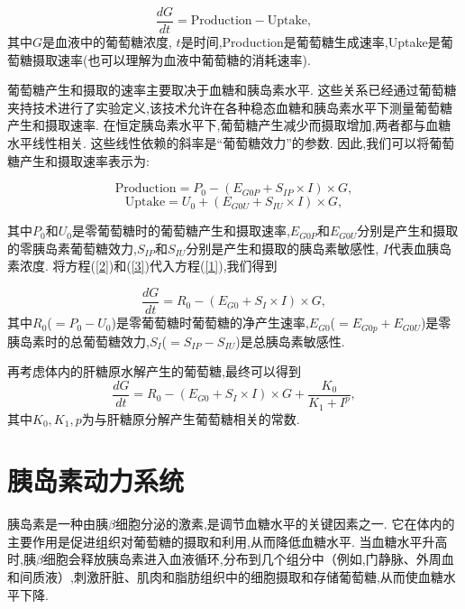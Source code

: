 \begin{equation}\label{1}
    \frac{dG}{dt} = \text{Production} - \text{Uptake},
\end{equation}
其中$G$是血液中的葡萄糖浓度, $t$是时间,Production是葡萄糖生成速率,Uptake是葡萄糖摄取速率(也可以理解为血液中葡萄糖的消耗速率). 

葡萄糖产生和摄取的速率主要取决于血糖和胰岛素水平. 这些关系已经通过葡萄糖夹持技术进行了实验定义,该技术允许在各种稳态血糖和胰岛素水平下测量葡萄糖产生和摄取速率\cite{bergman1985assessment}. 在恒定胰岛素水平下,葡萄糖产生减少而摄取增加,两者都与血糖水平线性相关\cite{best1981glucose}. 这些线性依赖的斜率是“葡萄糖效力”的参数. 因此,我们可以将葡萄糖产生和摄取速率表示为:

\begin{equation}\label{2}
    \text{Production} = P_0 -(E_{G0P} + S_{IP} \times I) \times G,
\end{equation}
\begin{equation}\label{3}
    \text{Uptake} = U_0 + (E_{G0U} + S_{IU} \times I) \times G,
\end{equation}

其中$P_0$和$U_0$是零葡萄糖时的葡萄糖产生和摄取速率,\(E_{G0P}\)和\(E_{G0U}\)分别是产生和摄取的零胰岛素葡萄糖效力,\(S_{IP}\)和\(S_{IU}\)分别是产生和摄取的胰岛素敏感性, $I$代表血胰岛素浓度. 将方程(\ref{2})和(\ref{3})代入方程(\ref{1}),我们得到

\begin{equation}
    \frac{dG}{dt} = R_0 -(E_{G0} + S_I \times I) \times G,
\end{equation}
其中$R_0$($=P_0-U_0$)是零葡萄糖时葡萄糖的净产生速率,\(E_{G0}\)($=E_{G0p}+E_{G0U}$)是零胰岛素时的总葡萄糖效力,\(S_I\)($=S_{IP}-S_{IU}$)是总胰岛素敏感性\cite{topp2000model}. 

再考虑体内的肝糖原水解产生的葡萄糖,最终可以得到
\begin{equation}
    \frac{dG}{dt} = R_0 -(E_{G0} + S_I \times I) \times G+\frac{K_0}{K_1+I^p},
\end{equation}
其中$K_0,K_1,p$为与肝糖原分解产生葡萄糖相关的常数\cite{bridgewater2020amplitude}. 
\section{胰岛素动力系统}
胰岛素是一种由胰$\beta$细胞分泌的激素,是调节血糖水平的关键因素之一. 它在体内的主要作用是促进组织对葡萄糖的摄取和利用,从而降低血糖水平. 当血糖水平升高时,胰$\beta$细胞会释放胰岛素进入血液循环,分布到几个组分中（例如,门静脉、外周血和间质液）,刺激肝脏、肌肉和脂肪组织中的细胞摄取和存储葡萄糖,从而使血糖水平下降. 

